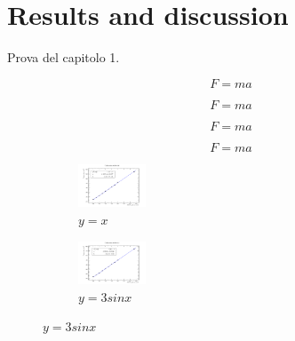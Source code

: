\chapter{Results and discussion}


Prova del capitolo 1.

\begin{equation}
    F = ma
\end{equation}


\begin{equation}
    F = ma
\end{equation}


\begin{equation}
    F = ma
\end{equation}


\begin{equation}
    F = ma
\end{equation}



\begin{figure}
    \centering
    \begin{subfigure}[b]{0.15\textwidth}
        \centering
        \includegraphics[width=2cm]{figures/ch0.pdf}
        \caption{$y=x$}
        \label{fig:y equals x}
    \end{subfigure}
    \hfill
    \begin{subfigure}[b]{0.15\textwidth}
        \centering
        \includegraphics[width=2cm]{figures/ch1.pdf}
        \caption{$y=3sinx$}
        \label{fig:three sin x}
    \end{subfigure}
\end{figure}

